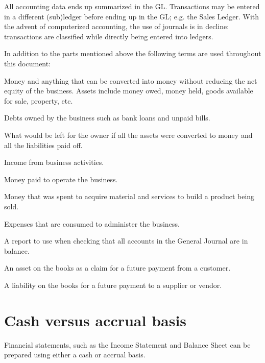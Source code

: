 All accounting data ends up summarized in the \acrshort{GL}. Transactions may be entered in a different (sub)ledger before ending up in the \acrshort{GL}; e.g. the Sales Ledger. With the advent of computerized accounting, the use of journals is in decline: transactions are classified while directly being entered into ledgers.

In addition to the parts mentioned above the following terms are used throughout this document:
\begin{description}[style=nextline]
        \item [Assets] Money and anything that can be converted into money without reducing
        the net equity of the business. Assets include money owed, money held, goods
        available for sale, property, etc.
        \item [Liabilities] Debts owned by the business such as bank loans and unpaid bills.
        \item [Equity] What would be left for the owner if all the assets were converted to
        money and all the liabilities paid off.
        \item [Revenue] Income from business activities.
        \item [Expense] Money paid to operate the business.
        \item [Cost of Goods] Money that was spent to acquire material and services to build a product being sold.
        \item [Operating Expenses] Expenses that are consumed to administer the business.
        \item [Trial Balance] A report to use when checking that all accounts in the
        General Journal are in balance.
        \item [Accounts Receivable] An asset on the books as a claim for a future payment
        from a customer.
        \item [Accounts Payable] A liability on the books for a future payment to a supplier
        or vendor.
\end{description}

\section{Cash versus accrual basis}
\label{sec-accounting-cash-vs-accrual}

Financial statements, such as the Income Statement and Balance Sheet can be prepared using
either a cash or accrual basis.


